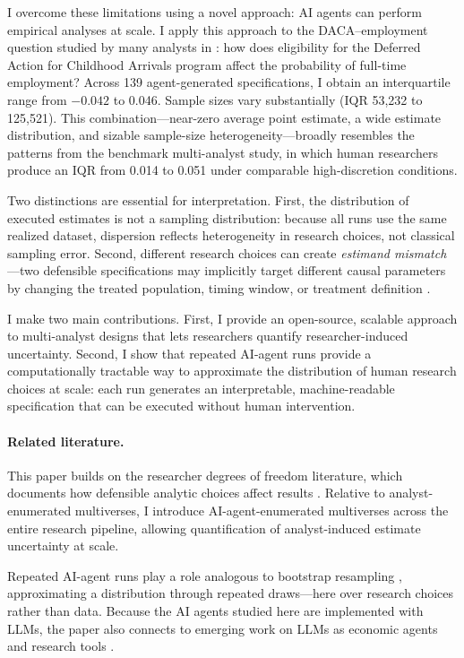 \documentclass[12pt]{article}
\begin{document}
I overcome these limitations using a novel approach: AI agents can perform empirical analyses at scale. I apply this approach to the DACA--employment question studied by many analysts in \citet{huntingtonklein2025sources}: how does eligibility for the Deferred Action for Childhood Arrivals program affect the probability of full-time employment?
Across 139 agent-generated specifications, I obtain an interquartile range from $-0.042$ to 0.046. Sample sizes vary substantially (IQR 53{,}232 to 125{,}521). This combination---near-zero average point estimate, a wide estimate distribution, and sizable sample-size heterogeneity---broadly resembles the patterns from the benchmark multi-analyst study, in which human researchers produce an IQR from 0.014 to 0.051 under comparable high-discretion conditions.

Two distinctions are essential for interpretation. First, the distribution of executed estimates is not a sampling distribution: because all runs use the same realized dataset, dispersion reflects heterogeneity in research choices, not classical sampling error. Second, different research choices can create \emph{estimand mismatch}---two defensible specifications may implicitly target different causal parameters by changing the treated population, timing window, or treatment definition \citep{lundberg2021estimand}.

I make two main contributions. First, I provide an open-source, scalable approach to multi-analyst designs that lets researchers quantify researcher-induced uncertainty. Second, I show that repeated AI-agent runs provide a computationally tractable way to approximate the distribution of human research choices at scale: each run generates an interpretable, machine-readable specification that can be executed without human intervention.

\paragraph{Related literature.}
This paper builds on the researcher degrees of freedom literature, which documents how defensible analytic choices affect results \citep{simmons2011false, gelman2013garden, steegen2016multiverse, simonsohn2020specification}. Relative to analyst-enumerated multiverses, I introduce AI-agent-enumerated multiverses across the entire research pipeline, allowing quantification of analyst-induced estimate uncertainty at scale.

Repeated AI-agent runs play a role analogous to bootstrap resampling \citep{efron1979bootstrap, andrews2000bootstrap}, approximating a distribution through repeated draws---here over research choices rather than data. Because the AI agents studied here are implemented with LLMs, the paper also connects to emerging work on LLMs as economic agents and research tools \citep{horton2023large, brand2023gpt, korinek2023generative, novymarx2026ai}.
\end{document}
